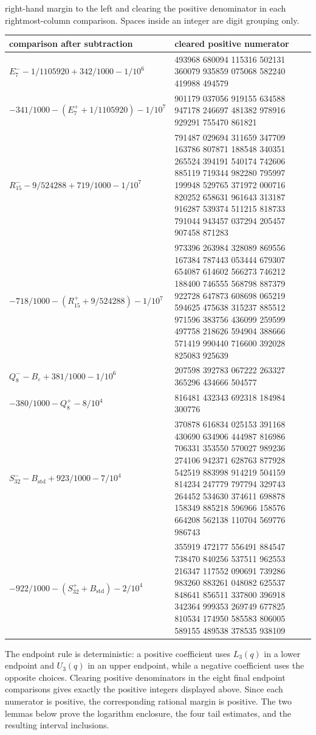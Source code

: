 \begin{remark}
  right-hand margin to the left and clearing the positive denominator in each
  rightmost-column comparison.  Spaces inside an integer are digit grouping
  only.
  \begin{center}
  \tiny
  \begin{tabular}{@{}L{0.28\textwidth}L{0.66\textwidth}@{}}
    \toprule
    \textbf{comparison after subtraction} &
    \textbf{cleared positive numerator} \\
    \midrule
    \(E_7^- -1/1105920+342/1000-1/10^6\) &
    { 493968 680094 115316 502131 360079 935859 075068 582240 419988 494579} \\
    \(-341/1000-(E_7^+ +1/1105920)-1/10^7\) &
    { 901179 037056 919155 634588 947178 246697 481382 978916 929291 755470 861821} \\
    \(R_{15}^- -9/524288+719/1000-1/10^7\) &
    { 791487 029694 311659 347709 163786 807871 188548 340351 265524 394191 540174 742606 885119 719344 982280 795997 199948 529765 371972 000716 820252 658631 961643 313187 916287 539374 511215 818733 791044 943457 037294 205457 907458 871283} \\
    \(-718/1000-(R_{15}^+ +9/524288)-1/10^7\) &
    { 973396 263984 328089 869556 167384 787443 053444 679307 654087 614602 566273 746212 188400 746555 568798 887379 922728 647873 608698 065219 594625 475638 315237 885512 971596 383756 436099 259599 497758 218626 594904 388666 571419 990440 716600 392028 825083 925639} \\
    \(Q_8^- -B_\varepsilon+381/1000-1/10^6\) &
    { 207598 392783 067222 263327 365296 434666 504577} \\
    \(-380/1000-Q_8^+-8/10^4\) &
    { 816481 432343 692318 184984 300776} \\
    \(S_{32}^- -B_{\mathrm{std}}+923/1000-7/10^4\) &
    { 370878 616834 025153 391168 430690 634906 444987 816986 706331 353550 570027 989236 274106 942371 628763 877928 542519 883998 914219 504159 814234 247779 797794 329743 264452 534630 374611 698878 158349 885218 596966 158576 664208 562138 110704 569776 986743} \\
    \(-922/1000-(S_{32}^+ +B_{\mathrm{std}})-2/10^4\) &
    { 355919 472177 556491 884547 738470 840256 537511 962553 216347 117552 090691 739286 983260 883261 048082 625537 848641 856511 337800 396918 342364 999353 269749 677825 810534 174950 585583 806005 589155 489538 378535 938109} \\
    \bottomrule
  \end{tabular}
  \end{center}
  The endpoint rule is deterministic: a positive
  coefficient uses \(L_3(q)\) in a lower endpoint and \(U_3(q)\) in an upper
  endpoint, while a negative coefficient uses the opposite choices.  Clearing
  positive denominators in the eight final endpoint comparisons gives exactly
  the positive integers displayed above.  Since each numerator is positive,
  the corresponding rational margin is positive.  The two lemmas below prove
  the logarithm enclosure, the four tail estimates, and the resulting interval
  inclusions.
\end{remark}

